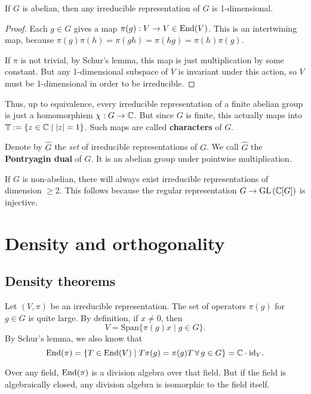 \documentclass[11pt, english]{article}
\begin{document}
\begin{prop}
 If $G$ is abelian, then any irreducible representation of $G$ is 1-dimensional.
\end{prop}
\begin{proof}
Each $g \in G$ gives a map $\pi(g):V \to V \in \operatorname{End}(V)$. This is an intertwining map, because $\pi(g)\pi(h)=\pi(gh)=\pi(hg)=\pi(h)\pi(g)$.

If $\pi$ is not trivial, by Schur's lemma, this map is just multiplication by some constant. But any 1-dimensional subspace of $V$ is invariant under this action, so $V$ must be 1-dimensional in order to be irreducible.
\end{proof}

Thus, up to equivalence, every irreducible representation of a finite abelian group is just a homomorphism $\chi:G \to \mathbb{C}$. But since $G$ is finite, this actually maps into $\mathbb T := \{ z \in \mathbb{C} \mid \lvert z \rvert = 1 \}$. Such maps are called \textbf{characters} of $G$.

Denote by $\widehat G$ the \emph{set} of irreducible representations of $G$. We call  $\widehat G$ the \textbf{Pontryagin dual} of $G$. It is an abelian group under pointwise multiplication.

\begin{remark}
  If $G$ is non-abelian, there will always exist irreducible representations of dimension $\geq 2$. This follows because the regular representation $G \to \operatorname{GL} \left( \mathbb{C}[G] \right)$ is injective.
\end{remark}

\newpage
\section{Density and orthogonality}


\subsection{Density theorems}

Let $(V,\pi)$ be an irreducible representation. The set of operators $\pi(g)$ for $g \in G$ is quite large. By definition, if $x \neq 0$, then
$$
V = \mathrm{Span} \{ \pi(g)x \mid g \in G \}.
$$
By Schur's lemma, we also know that 
$$
\operatorname{End}(\pi) = \{ T \in \operatorname{End}(V) \mid T\pi(g) = \pi(g) T \, \forall \, g \in G \} = \mathbb{C} \cdot \text{id}_V.
$$

\begin{remark}
Over any field, $\operatorname{End}(\pi)$ is a division algebra over that field. But if the field is algebraically closed, any division algebra is isomorphic to the field itself.
\end{remark}
\end{document}

